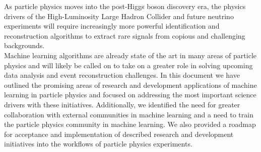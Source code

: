 As particle physics moves into the post-Higgs boson discovery era, the physics drivers of the High-Luminosity Large Hadron Collider and future neutrino experiments will require increasingly more powerful identification and reconstruction algorithms to extract rare signals from copious and challenging backgrounds.\\

Machine learning algorithms are already state of the art in many areas of particle physics and will likely be called on to take on a greater role in solving upcoming data analysis and event reconstruction challenges.
In this document we have outlined the promising areas of research and development applications of machine learning in particle physics and focused on addressing the most important science drivers with these initiatives.
Additionally, we identified the need for greater collaboration with external communities in machine learning and a need to train the particle physics community in machine learning.
We also provided a roadmap for acceptance and implementation of described research and development initiatives into the workflows of particle physics experiments.